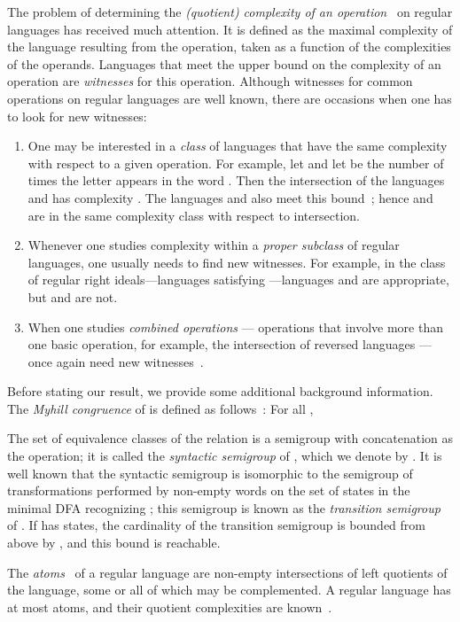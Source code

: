 \documentclass{llncs}
\newcommand{\be}{\begin{enumerate}}
\newcommand{\ee}{\end{enumerate}}
\begin{document}
The problem of determining the \emph{(quotient) complexity of an operation}~\cite{Brz10,Mas70,Yu01,YZS94} on regular languages has received much attention. It is defined as the maximal complexity of the language resulting  from the operation, taken as a function of the complexities of the operands.
Languages that meet the upper bound on the complexity of an operation are \emph{witnesses} for this operation.
Although witnesses for common operations on regular languages are well known, there are occasions when one has to look for new witnesses:
\be
\item
One may be interested in  a \emph{class} of languages that have the same complexity with respect to a given operation. 
For example, let  and let  be the number of times the letter  appears in the word .
Then the intersection of the languages  and  has complexity . 
The languages  and  also meet this bound~\cite{BJL13}; hence   and   are in the same complexity class with respect to intersection.
\item
Whenever one studies complexity within a  \emph{proper subclass} of regular languages, one usually needs to find new witnesses.
For example, in the class of regular right ideals---languages  satisfying ---languages   and  are appropriate, but  and  are not.
\item
When one studies \emph{combined operations} --- operations that involve more than one basic operation,  for example, the intersection of reversed languages --- once again need new witnesses~\cite{LMSY08}. 
\ee
Before stating our result, we provide some additional background information.
The \emph{Myhill congruence}  of  is defined as follows~\cite{Myh57}: For all , 

The set  of equivalence classes of the relation  is a semigroup with concatenation as the operation; it is called the \emph{syntactic semigroup} of , which we denote by . 
It is well known that the syntactic semigroup is isomorphic to the semigroup  of transformations performed by  non-empty words on the set of states in the minimal DFA  recognizing ; this semigroup is known as the \emph{transition semigroup} of .
If  has  states, the cardinality of the transition semigroup is bounded from above by , and this bound is reachable.

The \emph{atoms}~\cite{BrTa11,BrTa12} of a regular language are non-empty intersections of left quotients of the language, some or all of which may be complemented. A regular language has at most  atoms, and their quotient complexities are known~\cite{BrTa12}.
\end{document}
